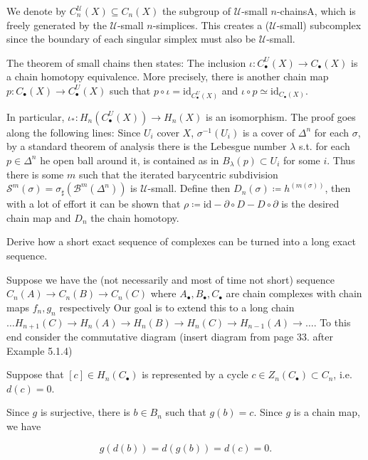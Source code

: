 We denote by \( C^{\mathcal{U}}_n(X) \subseteq C_n(X) \) the subgroup of \( \mathcal{U} \)-small \( n \)-chainsA, which is freely
generated by the \( \mathcal{U} \)-small \( n \)-simplices. This creates a (\( \mathcal{U} \)-small) subcomplex since the boundary
of each singular simplex must also be \( \mathcal{U} \)-small.

The theorem of small chains then states:
The inclusion \(\iota: C^{U}_\bullet(X) \to C_\bullet(X)\) is a chain homotopy equivalence. 
More precisely, there is another chain map \(p: C_\bullet(X) \to C^{U}_\bullet(X)\) such that \(p \circ \iota = \text{id}_{C^{U}_\bullet(X)}\) 
and \(\iota \circ p \simeq \text{id}_{C_\bullet(X)}\).

In particular, \(\iota_*: H_n(C^{U}_\bullet(X)) \to H_n(X)\) is an isomorphism.
The proof goes along the following lines:
Since \( U_i \) cover \( X \), \( \sigma^{-1}(U_i) \) is a cover of \( \Delta^n \) for each \( \sigma \),
by a standard theorem of analysis there is the Lebesgue number \( \lambda \) s.t. for each \( p \in \Delta^n \)
he open ball around it, is contained as in \( B_\lambda(p) \subset U_i \) for some \( i \). Thus there is some \( m \) such that
the iterated barycentric subdivision \( \mathcal{S}^m(\sigma) = \sigma_{\sharp}(\mathcal{B}^m(\Delta^n)) \) is \( \mathcal{U} \)-small.
Define then \( D_n(\sigma) \coloneqq h^{(m(\sigma))} \), then with a lot of effort it can be shown that \( \rho \coloneqq \text{id} - \partial \circ D - D \circ \partial \)
is the desired chain map and \( D_n \) the chain homotopy.



Derive how a short exact sequence of complexes can be turned into a long exact sequence.

Suppose we have the (not necessarily and most of time not short) sequence
\( C_n(A) \to C_n(B) \to C_n(C) \)
where \( A_\bullet, B_\bullet, C_\bullet \) are chain complexes
with chain maps \( f_n, g_n \) respectively
Our goal is to extend this to a long chain
\( \dots H_{n+1}(C) \to H_n(A) \to H_n(B) \to H_n(C) \to H_{n-1}(A) \to \dots \).
To this end consider the commutative diagram
(insert diagram from page 33. after Example 5.1.4)

Suppose that \([c] \in H_n(C_\bullet)\) is represented by a cycle \(c \in Z_n(C_\bullet) \subset C_n\), i.e. \(d(c) = 0\). 

Since \(g\) is surjective, there is \(b \in B_n\) such that \(g(b) = c\). Since \(g\) is a chain map, we have

\[g(d(b)) = d(g(b)) = d(c) = 0.\] 


